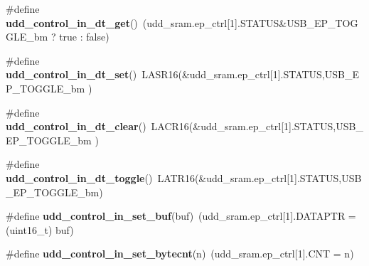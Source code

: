 \begin{DoxyCompactItemize}
\item 
\hypertarget{group__udd__xmega__usb__group_gac86135da845b7a4cd5b334f2799a4943}{\#define {\bfseries udd\-\_\-control\-\_\-in\-\_\-dt\-\_\-get}()~(udd\-\_\-sram.\-ep\-\_\-ctrl\mbox{[}1\mbox{]}.S\-T\-A\-T\-U\-S\&U\-S\-B\-\_\-\-E\-P\-\_\-\-T\-O\-G\-G\-L\-E\-\_\-bm ? true \-: false)}\label{group__udd__xmega__usb__group_gac86135da845b7a4cd5b334f2799a4943}

\item 
\hypertarget{group__udd__xmega__usb__group_ga05b59293f08c7bb4f0fb2390d8caf350}{\#define {\bfseries udd\-\_\-control\-\_\-in\-\_\-dt\-\_\-set}()~L\-A\-S\-R16(\&udd\-\_\-sram.\-ep\-\_\-ctrl\mbox{[}1\mbox{]}.S\-T\-A\-T\-U\-S,U\-S\-B\-\_\-\-E\-P\-\_\-\-T\-O\-G\-G\-L\-E\-\_\-bm )}\label{group__udd__xmega__usb__group_ga05b59293f08c7bb4f0fb2390d8caf350}

\item 
\hypertarget{group__udd__xmega__usb__group_ga2e1f267daf46c2202b4cc4917a5a586a}{\#define {\bfseries udd\-\_\-control\-\_\-in\-\_\-dt\-\_\-clear}()~L\-A\-C\-R16(\&udd\-\_\-sram.\-ep\-\_\-ctrl\mbox{[}1\mbox{]}.S\-T\-A\-T\-U\-S,U\-S\-B\-\_\-\-E\-P\-\_\-\-T\-O\-G\-G\-L\-E\-\_\-bm )}\label{group__udd__xmega__usb__group_ga2e1f267daf46c2202b4cc4917a5a586a}

\item 
\hypertarget{group__udd__xmega__usb__group_ga2aeff640b5d22316ec7906fc351f5ee9}{\#define {\bfseries udd\-\_\-control\-\_\-in\-\_\-dt\-\_\-toggle}()~L\-A\-T\-R16(\&udd\-\_\-sram.\-ep\-\_\-ctrl\mbox{[}1\mbox{]}.S\-T\-A\-T\-U\-S,U\-S\-B\-\_\-\-E\-P\-\_\-\-T\-O\-G\-G\-L\-E\-\_\-bm)}\label{group__udd__xmega__usb__group_ga2aeff640b5d22316ec7906fc351f5ee9}

\item 
\hypertarget{group__udd__xmega__usb__group_gad09a38e83b378c42879348287338df8c}{\#define {\bfseries udd\-\_\-control\-\_\-in\-\_\-set\-\_\-buf}(buf)~(udd\-\_\-sram.\-ep\-\_\-ctrl\mbox{[}1\mbox{]}.D\-A\-T\-A\-P\-T\-R = (uint16\-\_\-t) buf)}\label{group__udd__xmega__usb__group_gad09a38e83b378c42879348287338df8c}

\item 
\hypertarget{group__udd__xmega__usb__group_gaf7af88c6c6fa0580eb047101f97f4d9b}{\#define {\bfseries udd\-\_\-control\-\_\-in\-\_\-set\-\_\-bytecnt}(n)~(udd\-\_\-sram.\-ep\-\_\-ctrl\mbox{[}1\mbox{]}.C\-N\-T = n)}\label{group__udd__xmega__usb__group_gaf7af88c6c6fa0580eb047101f97f4d9b}

\end{DoxyCompactItemize}


